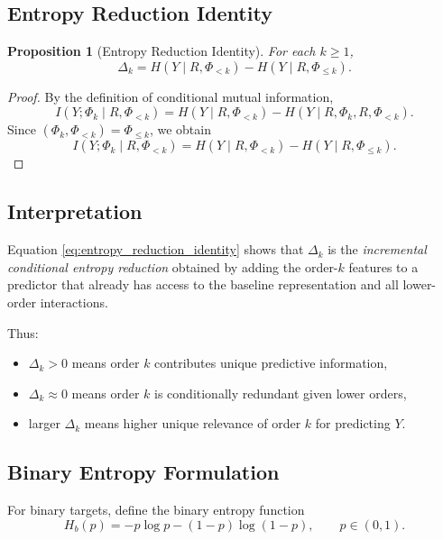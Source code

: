 \documentclass[11pt]{article}
\newtheorem{proposition}{Proposition}
\newcommand{\1}{\mathbf{1}}
\begin{document}
\subsection{Entropy Reduction Identity}

\begin{proposition}[Entropy Reduction Identity]
For each $k \ge 1$,
\begin{equation}
\Delta_k
=
H(Y \mid R,\Phi_{<k}) - H(Y \mid R,\Phi_{\le k}).
\label{eq:entropy_reduction_identity}
\end{equation}
\end{proposition}

\begin{proof}
By the definition of conditional mutual information,
\[
I(Y;\Phi_k \mid R,\Phi_{<k})
=
H(Y \mid R,\Phi_{<k}) - H(Y \mid R,\Phi_k,R,\Phi_{<k}).
\]
Since $(\Phi_k,\Phi_{<k}) = \Phi_{\le k}$, we obtain
\[
I(Y;\Phi_k \mid R,\Phi_{<k})
=
H(Y \mid R,\Phi_{<k}) - H(Y \mid R,\Phi_{\le k}).
\]
\end{proof}

\subsection{Interpretation}

Equation \eqref{eq:entropy_reduction_identity} shows that $\Delta_k$ is the
\emph{incremental conditional entropy reduction} obtained by adding the order-$k$ features to a
predictor that already has access to the baseline representation and all lower-order interactions.

Thus:
\begin{itemize}[leftmargin=1.5em]
    \item $\Delta_k > 0$ means order $k$ contributes unique predictive information,
    \item $\Delta_k \approx 0$ means order $k$ is conditionally redundant given lower orders,
    \item larger $\Delta_k$ means higher unique relevance of order $k$ for predicting $Y$.
\end{itemize}

\subsection{Binary Entropy Formulation}

For binary targets, define the binary entropy function
\begin{equation}
H_b(p) = -p \log p - (1-p)\log(1-p),
\qquad p \in (0,1).
\label{eq:binary_entropy}
\end{equation}
\end{document}
